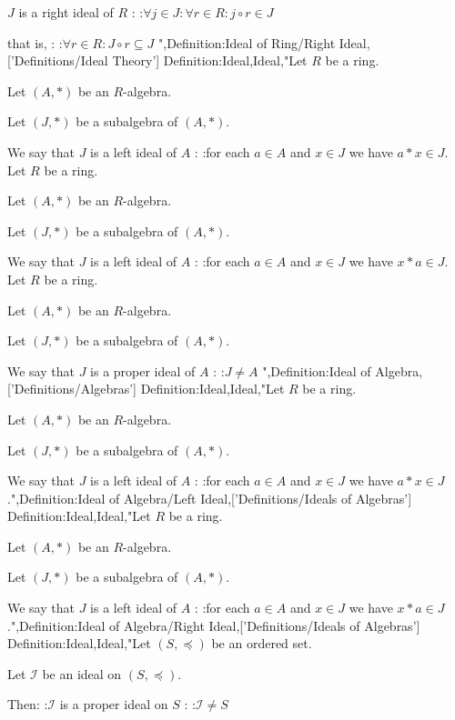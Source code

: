 $J$ is a right ideal of $R$ :
:$\forall j \in J: \forall r \in R: j \circ r \in J$

that is, :
:$\forall r \in R: J \circ r \subseteq J$
",Definition:Ideal of Ring/Right Ideal,['Definitions/Ideal Theory']
Definition:Ideal,Ideal,"Let $R$ be a ring.

Let $\left( A, \ast \right)$ be an $R$-algebra.

Let $\left( J, \ast \right)$ be a subalgebra of $\left( A, \ast \right)$. 


We say that $J$ is a left ideal of $A$ :
:for each $a \in A$ and $x \in J$ we have $a \ast x \in J$.
Let $R$ be a ring.

Let $\left( A, \ast \right)$ be an $R$-algebra.

Let $\left( J, \ast \right)$ be a subalgebra of $\left( A, \ast \right)$. 


We say that $J$ is a left ideal of $A$ :
:for each $a \in A$ and $x \in J$ we have $x \ast a \in J$.
Let $R$ be a ring.

Let $\left( A, \ast \right)$ be an $R$-algebra.

Let $\left( J, \ast \right)$ be a subalgebra of $\left( A, \ast \right)$. 


We say that $J$ is a proper ideal of $A$ :
:$J \ne A$
",Definition:Ideal of Algebra,['Definitions/Algebras']
Definition:Ideal,Ideal,"Let $R$ be a ring.

Let $\left( A, \ast \right)$ be an $R$-algebra.

Let $\left( J, \ast \right)$ be a subalgebra of $\left( A, \ast \right)$. 


We say that $J$ is a left ideal of $A$ :
:for each $a \in A$ and $x \in J$ we have $a \ast x \in J$.",Definition:Ideal of Algebra/Left Ideal,['Definitions/Ideals of Algebras']
Definition:Ideal,Ideal,"Let $R$ be a ring.

Let $\left( A, \ast \right)$ be an $R$-algebra.

Let $\left( J, \ast \right)$ be a subalgebra of $\left( A, \ast \right)$. 


We say that $J$ is a left ideal of $A$ :
:for each $a \in A$ and $x \in J$ we have $x \ast a \in J$.",Definition:Ideal of Algebra/Right Ideal,['Definitions/Ideals of Algebras']
Definition:Ideal,Ideal,"Let $\left( S, \preccurlyeq \right)$ be an ordered set.

Let $\mathcal I$ be an ideal on $\left( S, \preccurlyeq \right)$.


Then:
:$\mathcal I$ is a proper ideal on $S$
:
:$\mathcal I \ne S$

